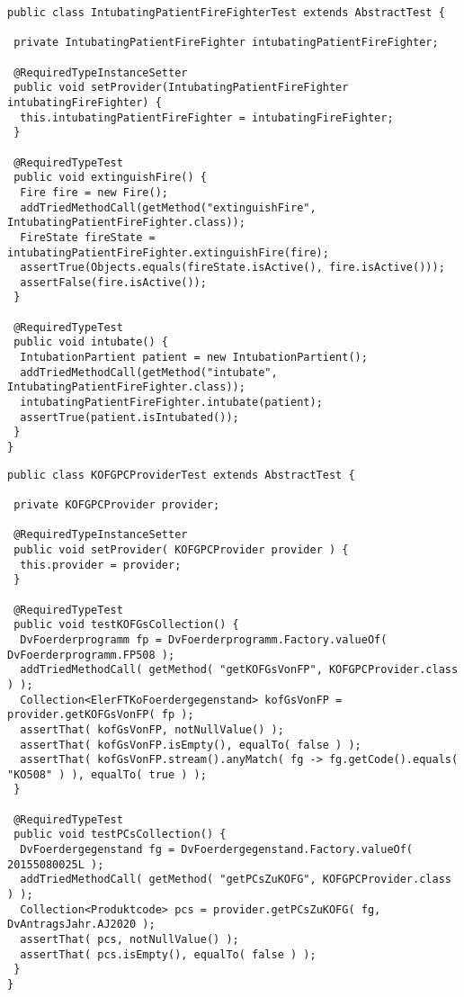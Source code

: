 \begin{lstlisting}[style = java, caption = Interface IntubatingPatientFireFighterTest, captionpos = b, label = lst_testklassen_tei6]
public class IntubatingPatientFireFighterTest extends AbstractTest {

 private IntubatingPatientFireFighter intubatingPatientFireFighter;

 @RequiredTypeInstanceSetter
 public void setProvider(IntubatingPatientFireFighter intubatingFireFighter) {
  this.intubatingPatientFireFighter = intubatingFireFighter;
 }

 @RequiredTypeTest
 public void extinguishFire() {
  Fire fire = new Fire();
  addTriedMethodCall(getMethod("extinguishFire", IntubatingPatientFireFighter.class));
  FireState fireState = intubatingPatientFireFighter.extinguishFire(fire);
  assertTrue(Objects.equals(fireState.isActive(), fire.isActive()));
  assertFalse(fire.isActive());
 }

 @RequiredTypeTest
 public void intubate() {
  IntubationPartient patient = new IntubationPartient();
  addTriedMethodCall(getMethod("intubate", IntubatingPatientFireFighter.class));
  intubatingPatientFireFighter.intubate(patient);
  assertTrue(patient.isIntubated());
 }
}
\end{lstlisting}
\pagebreak
\begin{lstlisting}[style = java, caption = Interface KOFGPCProviderTest, captionpos = b, label = lst_testklassen_tei7]
public class KOFGPCProviderTest extends AbstractTest {

 private KOFGPCProvider provider;

 @RequiredTypeInstanceSetter
 public void setProvider( KOFGPCProvider provider ) {
  this.provider = provider;
 }

 @RequiredTypeTest
 public void testKOFGsCollection() {
  DvFoerderprogramm fp = DvFoerderprogramm.Factory.valueOf( DvFoerderprogramm.FP508 );
  addTriedMethodCall( getMethod( "getKOFGsVonFP", KOFGPCProvider.class ) );
  Collection<ElerFTKoFoerdergegenstand> kofGsVonFP = provider.getKOFGsVonFP( fp );
  assertThat( kofGsVonFP, notNullValue() );
  assertThat( kofGsVonFP.isEmpty(), equalTo( false ) );
  assertThat( kofGsVonFP.stream().anyMatch( fg -> fg.getCode().equals( "KO508" ) ), equalTo( true ) );
 }

 @RequiredTypeTest
 public void testPCsCollection() {
  DvFoerdergegenstand fg = DvFoerdergegenstand.Factory.valueOf( 20155080025L );
  addTriedMethodCall( getMethod( "getPCsZuKOFG", KOFGPCProvider.class ) );
  Collection<Produktcode> pcs = provider.getPCsZuKOFG( fg, DvAntragsJahr.AJ2020 );
  assertThat( pcs, notNullValue() );
  assertThat( pcs.isEmpty(), equalTo( false ) );
 }
}
\end{lstlisting}
\noindent
